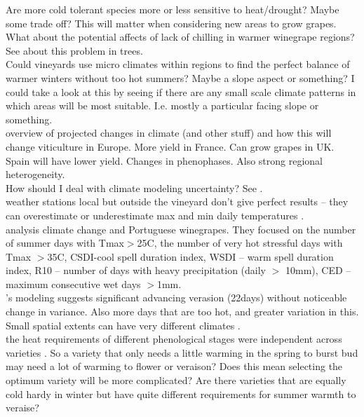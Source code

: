 \documentclass[11pt,letter]{article}
\begin{document}
Are more cold tolerant species more or less sensitive to heat/drought? Maybe some trade off? This will matter when considering new areas to grow grapes. \\

What about the potential affects of lack of chilling in warmer winegrape regions? See \cite{Luedeling2009} about this problem in trees. \\ 

Could vineyards use micro climates within regions to find the perfect balance of warmer winters without too hot summers? Maybe a slope aspect or something? I could take a look at this by seeing if there are any small scale climate patterns in which areas will be most suitable. I.e. mostly a particular facing slope or something. \\

\cite{Fraga2016a} overview of projected changes in climate (and other stuff) and how this will change viticulture in Europe. More yield in France. Can grow grapes in UK. Spain will have lower yield. Changes in phenophases. Also strong regional heterogeneity. \\ 

How should I deal with climate modeling uncertainty? See \cite{Deser2012}. \\

weather stations local but outside the vineyard don't give perfect results – they can overestimate or underestimate max and min daily temperatures \citep{Antivilo2017}. \\

\cite{Blanco-Ward2017} analysis climate change and Portuguese winegrapes. They focused on the number of summer days with Tmax$>$25\textdegree C, the number of very hot stressful days with Tmax $>$35\textdegree C, CSDI-cool spell duration index, WSDI – warm spell duration index, R10 – number of days with heavy precipitation (daily $>$ 10mm), CED – maximum consecutive wet days $>$1mm. \\

\cite{Blanco-Ward2017}'s modeling suggests significant advancing verasion (22days) without noticeable change in variance. Also more days that are too hot, and greater variation in this.  \\

Small spatial extents can have very different climates \citep{Courault2001}. \\

the heat requirements of different phenological stages were independent across varieties \citep{Duchene2010}. So a variety that only needs a little warming in the spring to burst bud may need a lot of warming to flower or veraison? Does this mean selecting the optimum variety will be more complicated? Are there varieties that are equally cold hardy in winter but have quite different requirements for summer warmth to veraise? \\
\end{document}
